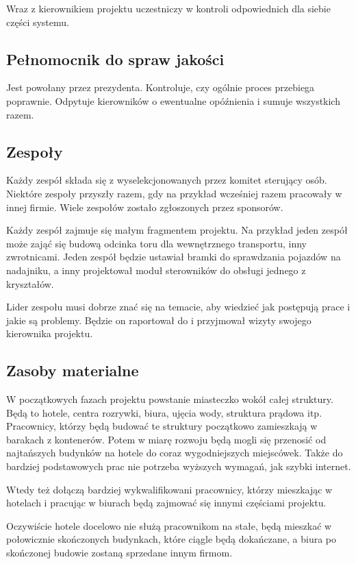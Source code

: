 Wraz z kierownikiem projektu uczestniczy w kontroli odpowiednich dla siebie części systemu.

\subsection{Pełnomocnik do spraw jakości}
Jest powołany przez prezydenta. Kontroluje, czy ogólnie proces przebiega poprawnie.
Odpytuje kierowników o ewentualne opóźnienia i sumuje wszystkich razem.

\subsection{Zespoły}
Każdy zespół składa się z wyselekcjonowanych przez komitet sterujący osób.
Niektóre zespoły przyszły razem, gdy na przykład wcześniej razem pracowały w innej firmie.
Wiele zespołów zostało zgłoszonych przez sponsorów.

Każdy zespół zajmuje się małym fragmentem projektu. Na przykład jeden zespół może zająć się budową odcinka toru dla wewnętrznego transportu, inny zwrotnicami.
Jeden zespół będzie ustawiał bramki do sprawdzania pojazdów na nadajniku, a inny projektował moduł sterowników do obsługi jednego z kryształów.

Lider zespołu musi dobrze znać się na temacie, aby wiedzieć jak postępują prace i jakie są problemy. Będzie on raportował do i przyjmował wizyty swojego kierownika projektu.

\subsection{Zasoby materialne}
W początkowych fazach projektu powstanie miasteczko wokół całej struktury. Będą to hotele, centra rozrywki, biura, ujęcia wody, struktura prądowa itp.
Pracownicy, którzy będą budować te struktury początkowo zamieszkają w barakach z kontenerów. Potem w miarę rozwoju będą mogli się przenosić od najtańszych budynków na hotele do coraz wygodniejszych miejscówek.
Także do bardziej podstawowych prac nie potrzeba wyższych wymagań, jak szybki internet.

Wtedy też dołączą bardziej wykwalifikowani pracownicy, którzy mieszkając w hotelach i pracując w biurach będą zajmować się innymi częściami projektu.

Oczywiście hotele docelowo nie służą pracownikom na stałe, będą mieszkać w połowicznie skończonych budynkach, które ciągle będą dokańczane, a biura po skończonej budowie zostaną sprzedane innym firmom.

